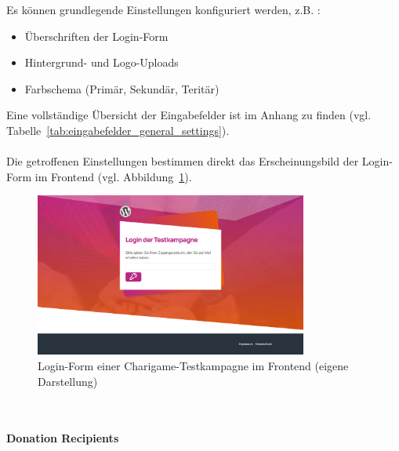 Es können grundlegende Einstellungen konfiguriert werden, z.B. :
\begin{itemize}
\item Überschriften der Login-Form
\item Hintergrund- und Logo-Uploads
\item Farbschema (Primär, Sekundär, Teritär)
\end{itemize}
Eine vollständige Übersicht der Eingabefelder ist im Anhang zu finden (vgl. Tabelle~\ref{tab:eingabefelder_general_settings}).
\\\\
Die getroffenen Einstellungen bestimmen direkt das Erscheinungsbild der Login-Form im Frontend (vgl. Abbildung~\ref{fig:login-textkampagne}).

\begin{figure}[H]
    \centering
    \includegraphics[width=0.8\textwidth]{images/legacy_login_testkampagne}
    \caption{Login-Form einer Charigame-Testkampagne im Frontend (eigene Darstellung)}
    \label{fig:login-textkampagne}
\end{figure}
\\\\
\textbf{Donation Recipients}


